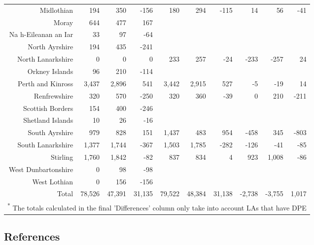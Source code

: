 \documentclass[
  12pt,
]{article}
\begin{document}
\begin{landscape}
\begin{table}[H]
\begin{tabular}[t]{rrrrrrrrrr}
Midlothian & 194 & 350 & -156 & 180 & 294 & -115 & 14 & 56 & -41\\
Moray & 644 & 477 & 167 &  &  &  &  &  & \\
Na h-Eileanan an Iar & 33 & 97 & -64 &  &  &  &  &  & \\
North Ayrshire & 194 & 435 & -241 &  &  &  &  &  & \\
North Lanarkshire & 0 & 0 & 0 & 233 & 257 & -24 & -233 & -257 & 24\\
Orkney Islands & 96 & 210 & -114 &  &  &  &  &  & \\
Perth and Kinross & 3,437 & 2,896 & 541 & 3,442 & 2,915 & 527 & -5 & -19 & 14\\
Renfrewshire & 320 & 570 & -250 & 320 & 360 & -39 & 0 & 210 & -211\\
Scottish Borders & 154 & 400 & -246 &  &  &  &  &  & \\
Shetland Islands & 10 & 26 & -16 &  &  &  &  &  & \\
South Ayrshire & 979 & 828 & 151 & 1,437 & 483 & 954 & -458 & 345 & -803\\
South Lanarkshire & 1,377 & 1,744 & -367 & 1,503 & 1,785 & -282 & -126 & -41 & -85\\
Stirling & 1,760 & 1,842 & -82 & 837 & 834 & 4 & 923 & 1,008 & -86\\
West Dunbartonshire & 0 & 98 & -98 &  &  &  &  &  & \\
West Lothian & 0 & 156 & -156 &  &  &  &  &  & \\
\midrule
Total & 78,526 & 47,391 & 31,135 & 79,522 & 48,384 & 31,138 & -2,738 & -3,755 & 1,017\\
\bottomrule
\multicolumn{10}{l}{\rule{0pt}{1em}\textsuperscript{*} The totals calculated in the final 'Differences' column only take into account LAs that have DPE}\\
\end{tabular}
\end{table}
\end{landscape}

\hypertarget{references}{%
\subsection*{References}\label{references}}
\end{document}
